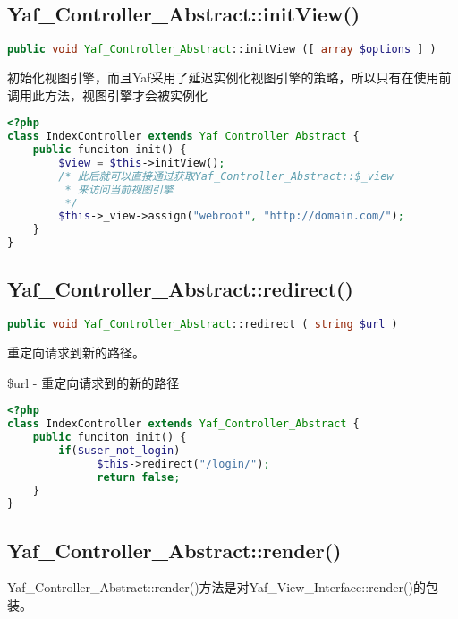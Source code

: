 \subsection{Yaf\_Controller\_Abstract::initView()}


\begin{lstlisting}[language=PHP]
public void Yaf_Controller_Abstract::initView ([ array $options ] )
\end{lstlisting}


初始化视图引擎，而且Yaf采用了延迟实例化视图引擎的策略，所以只有在使用前调用此方法，视图引擎才会被实例化

\begin{lstlisting}[language=PHP]
<?php
class IndexController extends Yaf_Controller_Abstract {
    public funciton init() {
        $view = $this->initView();
        /* 此后就可以直接通过获取Yaf_Controller_Abstract::$_view
         * 来访问当前视图引擎 
         */
        $this->_view->assign("webroot", "http://domain.com/");
    }
}
\end{lstlisting}

\subsection{Yaf\_Controller\_Abstract::redirect()}

\begin{lstlisting}[language=PHP]
public void Yaf_Controller_Abstract::redirect ( string $url )
\end{lstlisting}



重定向请求到新的路径。

\begin{compactenum}
\item \$url - 重定向请求到的新的路径
\end{compactenum}

\begin{lstlisting}[language=PHP]
<?php
class IndexController extends Yaf_Controller_Abstract {
    public funciton init() {
        if($user_not_login)
              $this->redirect("/login/");
              return false;
    }
}
\end{lstlisting}

\subsection{Yaf\_Controller\_Abstract::render()}

Yaf\_Controller\_Abstract::render()方法是对Yaf\_View\_Interface::render()的包装。

